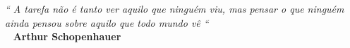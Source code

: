 \def\textoEpigrafe{
  A tarefa não é tanto ver aquilo que ninguém viu, mas pensar o que ninguém ainda pensou sobre aquilo que todo mundo vê
}

\def\autorEpigrafe{Arthur Schopenhauer}

\begin{epigrafe}
  \vspace*{\fill}
  \hfill{}
  \parbox{6cm}{
    \begin{flushright}
      \textit{``\textoEpigrafe``}\\
      \bigbreak\
      \textbf{\autorEpigrafe}
  
    \end{flushright}
  }
\end{epigrafe}